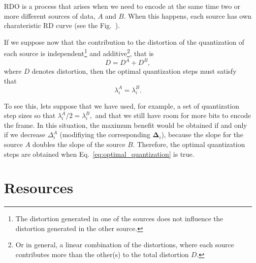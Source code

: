 RDO is a process that arises when we need to encode at the same time
two or more different sources of data, $A$ and $B$. When this happens,
each source has own charateristic RD curve (see the
Fig.~\cite{RD_slopes}).

If we suppose now that the contribution to the distortion of the
quantization of each source is independent\footnote{The distortion
generated in one of the sources does not influence the distortion
generated in the other source.} and additive\footnote{Or in general, a
linear combination of the distortions, where each source contributes
more than the other(s) to the total distortion $D$.}, that is
\begin{equation}
  D = D^A + D^B,
  \label{eq:additive}
\end{equation}
where $D$ denotes distortion, then the optimal quantization steps must
satisfy that~\cite{vetterli1995wavelets,sayood2017introduction}
\begin{equation}
  \lambda^A_i = \lambda^B_i.
  \label{eq:optimal_quantization}
\end{equation}

To see this, lets suppose that we have used, for example, a set of
quantization step sizes so that $\lambda^A_i/2 = \lambda^B_i,$ and
that we still have room for more bits to encode the frame. In this
situation, the maximum benefit would be obtained if and only if we
decrease $\Delta^A_i$ (modifiying the corresponding
$\mathbf{\Delta}_i$), because the slope for the source $A$ doubles
the slope of the source $B$. Therefore, the optimal quantization
steps are obtained when Eq.~\ref{eq:optimal_quantization} is
true.


\section{Resources}
\renewcommand{\addcontentsline}[3]{}%

